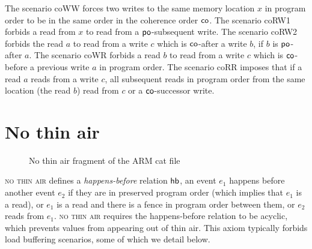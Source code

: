 \documentclass[a4paper]{article}
\begin{document}
The scenario \textsf{coWW} forces two writes to the same memory location $x$ in
program order to be in the same order in the coherence order $\mathsf{co}$. The
scenario \textsf{coRW1} forbids a read from $x$ to read from a $\mathsf{po}$-subsequent
write.  The scenario \textsf{coRW2} forbids the read $a$ to read from a write
$c$ which is $\mathsf{co}$-after a write $b$, if $b$ is $\mathsf{po}$-after $a$. The scenario
\textsf{coWR} forbids a read $b$ to read from a write $c$ which is $\mathsf{co}$-before
a previous write $a$ in program order. The scenario \textsf{coRR} imposes that
if a read $a$ reads from a write $c$, all subsequent reads in program order
from the same location (\eg the read $b$) read from $c$ or a $\mathsf{co}$-successor
write.


\clearpage

\section{No thin air \label{sec:no-thin-air}}

\begin{figure}[!h]

\vspace*{-7mm}
\caption{No thin air fragment of the ARM cat file}
\end{figure}

\textsc{no thin air} defines a \emph{happens-before} relation $\mathsf{hb}$, \ie an
event $e_1$ happens before another event $e_2$ if they are in preserved program
order (which implies that $e_1$ is a read), or $e_1$ is a read and there is a
fence in program order between them, or $e_2$ reads from $e_1$. \textsc{no thin
air} requires the happens-before relation to be acyclic, which prevents values
from appearing out of thin air. This axiom typically forbids load buffering
scenarios, some of which we detail below.
\end{document}
